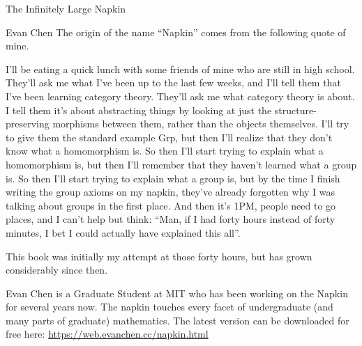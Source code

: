 \begin{boxResource}[sidebyside]{The Infinitely Large Napkin}
\begin{boxQuote}{Evan Chen}
The origin of the name “Napkin” comes from the following quote of mine.
    \begin{center}
        I’ll be eating a quick lunch with some friends of mine who are still in high school.  They’ll ask me what I’ve been up to the last few weeks, and I’ll tell them that I’ve been learning category theory. They’ll ask me what category theory is about. I tell them it’s about abstracting things by looking at just the structure-preserving morphisms between them, rather than the objects themselves. I’ll try to give them the standard example Grp, but then I’ll realize that they don’t know what a homomorphism is.  So then I’ll start trying to explain what a homomorphism is, but then I’ll remember that they haven’t learned what a group is. So then I’ll start trying to explain what a group is, but by the time I finish writing the group axioms on my napkin, they’ve already forgotten why I was talking about groups in the first place. And then it’s 1PM, people need to go places, and I can’t help but think: “Man, if I had forty hours instead of forty minutes, I bet I could actually have explained this all”.
    \end{center}
This book was initially my attempt at those forty hours, but has grown considerably since then.
\end{boxQuote}
\tcblower
Evan Chen is a Graduate Student at MIT who has been working on the Napkin for several years now.
The napkin touches every facet of undergraduate (and many parts of graduate) mathematics.
The latest version can be downloaded for free here: \url{https://web.evanchen.cc/napkin.html}
\end{boxResource}
%
